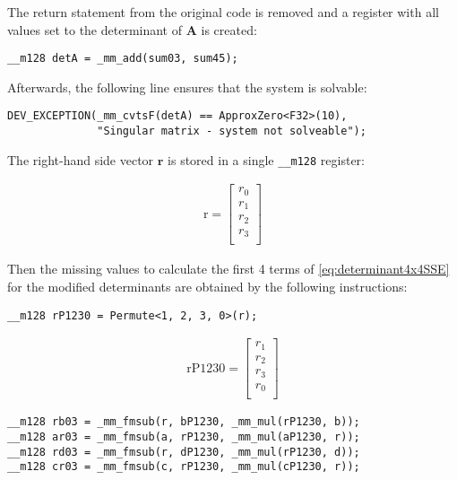 The return statement from the original code is removed and a register with all values set to the determinant of $\mathbf{A}$ is created:

\begin{verbatim}
__m128 detA = _mm_add(sum03, sum45);
\end{verbatim}

Afterwards, the following line ensures that the system is solvable:

\begin{verbatim}
DEV_EXCEPTION(_mm_cvtsF(detA) == ApproxZero<F32>(10), 
              "Singular matrix - system not solveable");
\end{verbatim} 

The right-hand side vector $\mathbf{r}$ is stored in a single \texttt{__m128} register:


\begin{align*}
\mathrm{r} 
=
\begin{bmatrix}
r_0\\
r_1\\
r_2\\
r_3\\
\end{bmatrix}
\end{align*}


Then the missing values to calculate the first 4 terms of \cref{eq:determinant4x4SSE} for the modified determinants are obtained by the following instructions:

\begin{verbatim}
__m128 rP1230 = Permute<1, 2, 3, 0>(r);
\end{verbatim}


\begin{align*}
\mathrm{rP1230} 
=
\begin{bmatrix}
r_1\\
r_2\\
r_3\\
r_0\\
\end{bmatrix}
\end{align*}


\begin{verbatim}
__m128 rb03 = _mm_fmsub(r, bP1230, _mm_mul(rP1230, b));
__m128 ar03 = _mm_fmsub(a, rP1230, _mm_mul(aP1230, r));
__m128 rd03 = _mm_fmsub(r, dP1230, _mm_mul(rP1230, d));
__m128 cr03 = _mm_fmsub(c, rP1230, _mm_mul(cP1230, r));
\end{verbatim}

